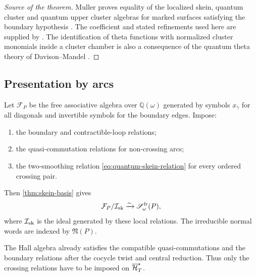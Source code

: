 \begin{proof}[Source of the theorem]
Muller proves equality of the localized skein, quantum cluster and quantum
upper cluster algebras for marked surfaces satisfying the boundary
hypothesis \cite{Muller}.  The coefficient and stated refinements used here
are supplied by \cite{IshibashiKanoYuasa,CaoHuangWang}.  The identification of
theta functions with normalized cluster monomials inside a cluster chamber is
also a consequence of the quantum theta theory of Davison--Mandel
\cite{DavisonMandel}.
\end{proof}

\subsection{Presentation by arcs}

Let $\mathcal F_P$ be the free associative algebra over
$\mathbb Q(\omega)$ generated by symbols $x_\gamma$ for all diagonals and
invertible symbols for the boundary edges.  Impose:
\begin{enumerate}[label=(\roman*),leftmargin=2.3em]
\item the boundary and contractible-loop relations;
\item the quasi-commutation relations for non-crossing arcs;
\item the two-smoothing relation \eqref{eq:quantum-skein-relation} for every
      ordered crossing pair.
\end{enumerate}
Then \cref{thm:skein-basis} gives
\begin{equation}
 \mathcal F_P/\mathcal I_{\rm sk}
 \xrightarrow{\sim}
 \mathscr S_\omega^{\rm fr}(P),
 \label{eq:skein-presentation}
\end{equation}
where $\mathcal I_{\rm sk}$ is the ideal generated by these local relations.
The irreducible normal words are indexed by $\mathfrak N(P)$.

The Hall algebra already satisfies the compatible quasi-commutations and the
boundary relations after the cocycle twist and central reduction.  Thus only
the crossing relations have to be imposed on $\overline{\mathcal H}_{T}^{\star}$.
